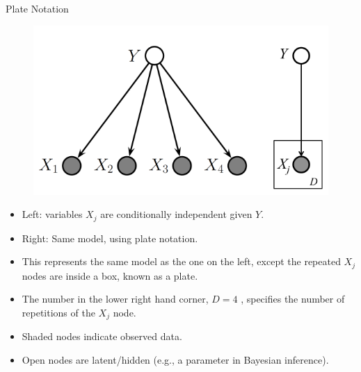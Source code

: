 \documentclass[handout]{beamer}
\begin{document}
\begin{frame}{Plate Notation}
\scriptsize{


\begin{figure}[h!]
	\centering
	\includegraphics[scale=0.35]{pics/plate.png}
	\end{figure} 


\begin{itemize}
\item Left: variables $X_j$ are conditionally independent given $Y$. 
\item Right: Same model, using plate notation. 
\item This represents the same model as the one on the left, except the repeated $X_j$ nodes are inside a box, known as a plate.
\item The number in the lower right hand corner, $D=4$ , specifies the number of repetitions of the $X_j$ node. 
\item  Shaded nodes indicate observed data. 
\item Open nodes are latent/hidden (e.g., a parameter in Bayesian inference).

\end{itemize}



} 

\end{frame}
\end{document}
